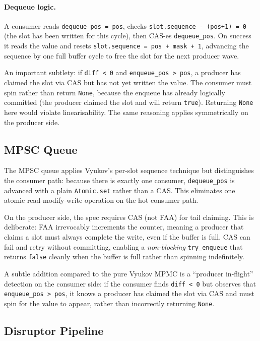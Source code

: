 \documentclass[11pt,a4paper]{article}
\begin{document}
\paragraph{Dequeue logic.}
A consumer reads \texttt{dequeue\_pos = pos}, checks \texttt{slot.sequence - (pos+1) = 0}
(the slot has been written for this cycle), then CAS-es \texttt{dequeue\_pos}. On success
it reads the value and resets \texttt{slot.sequence = pos + mask + 1}, advancing the sequence
by one full buffer cycle to free the slot for the next producer wave.

An important subtlety: if \texttt{diff < 0} and \texttt{enqueue\_pos > pos}, a producer has
claimed the slot via CAS but has not yet written the value. The consumer must spin rather than
return \texttt{None}, because the enqueue has already logically committed (the producer
claimed the slot and will return \texttt{true}). Returning \texttt{None} here would violate
linearisability. The same reasoning applies symmetrically on the producer side.

\subsection{MPSC Queue }
\label{subsec:mpsc}

The MPSC queue applies Vyukov's per-slot sequence technique but distinguishes the
consumer path: because there is exactly one consumer, \texttt{dequeue\_pos} is advanced
with a plain \texttt{Atomic.set} rather than a CAS. This eliminates one atomic
read-modify-write operation on the hot consumer path.

On the producer side, the spec requires CAS (not FAA) for tail claiming. This is deliberate:
FAA irrevocably increments the counter, meaning a producer that claims a slot must always
complete the write, even if the buffer is full. CAS can fail and retry without committing,
enabling a \emph{non-blocking} \texttt{try\_enqueue} that returns \texttt{false} cleanly
when the buffer is full rather than spinning indefinitely.

A subtle addition compared to the pure Vyukov MPMC is a ``producer in-flight'' detection
on the consumer side: if the consumer finds \texttt{diff < 0} but observes that
\texttt{enqueue\_pos > pos}, it knows a producer has claimed the slot via CAS and must spin
for the value to appear, rather than incorrectly returning \texttt{None}.

\subsection{Disruptor Pipeline}
\label{subsec:disruptor}
\end{document}
